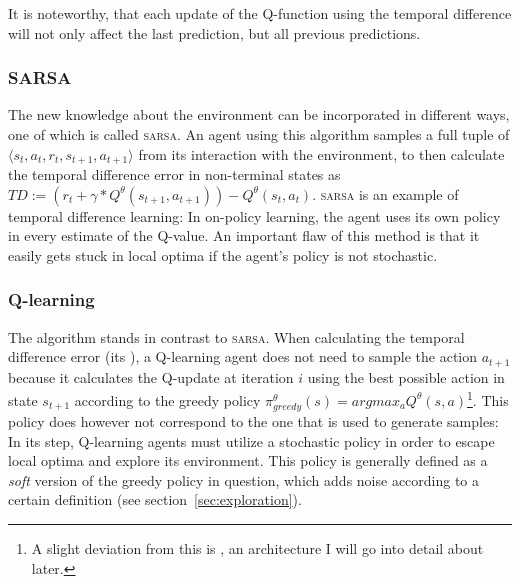 \noindent It is noteworthy, that each update of the Q-function using the temporal difference will not only affect the last prediction, but all previous predictions.



\subsubsection*{\textsc{SARSA}}
The new knowledge about the environment can be incorporated in different ways, one of which is called \textsc{sarsa}. An agent using this algorithm samples a full tuple of $\langle s_t, a_t, r_t, s_{t+1}, a_{t+1} \rangle$ from its interaction with the environment, to then calculate the temporal difference error in non-terminal states as $ TD := (r_t + \gamma * Q^\theta(s_{t+1}, a_{t+1})) - Q^\theta(s_t, a_t)  $. \textsc{sarsa} is an example of  temporal difference learning: In on-policy learning, the agent uses its own policy in every estimate of the Q-value. An important flaw of this method is that it easily gets stuck in local optima if the agent's policy is not stochastic.

\subsubsection*{Q-learning}

\label{sec:qlearn}

The  algorithm \cite{watkins_learning_1989} stands in contrast to \textsc{sarsa}. When calculating the temporal difference error (its ), a Q-learning agent does not need to sample the action $a_{t+1}$ because it calculates the Q-update at iteration $i$ using the best possible action in state $s_{t+1}$ according to the greedy policy $\pi^\theta_{greedy}(s) = argmax_aQ^\theta(s,a)$\footnote{A slight deviation from this is , an architecture I will go into detail about later.}. This policy does however not correspond to the one that is used to generate samples: In its  step, Q-learning agents must utilize a stochastic policy in order to escape local optima and explore its environment. This policy is generally defined as a \textit{soft} version of the greedy policy in question, which adds noise according to a certain definition (see section~\ref{sec:exploration}). 

